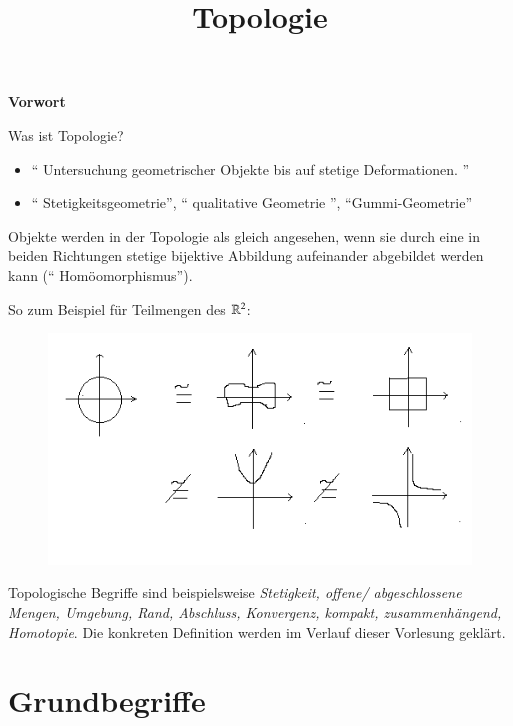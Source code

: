 \documentclass[a4paper,10pt]{scrartcl}
\title{Topologie}
\begin{document}
\maketitle

\tableofcontents
\newpage
\begin{center}
\LARGE\textbf{Vorwort}
\end{center}
\begin{seg}{Was ist Topologie?}
\begin{itemize}
\item "` Untersuchung geometrischer Objekte bis auf stetige Deformationen. "'
\item "` Stetigkeitsgeometrie"', "` qualitative Geometrie "', "`Gummi-Geometrie"'
\end{itemize}
Objekte werden in der Topologie als gleich angesehen, wenn sie durch eine in beiden Richtungen stetige bijektive Abbildung aufeinander abgebildet werden kann ("` Homöomorphismus"').
\end{seg}
So zum Beispiel für Teilmengen des $\mathbb{R}^2$:
\begin{figure}[h]
\centering
\includegraphics[scale=0.7]{fig1.png}
\end{figure}
\begin{ex*} 
Topologische Begriffe sind beispielsweise \emph{Stetigkeit, offene/ abgeschlossene Mengen, Umgebung, Rand, Abschluss, Konvergenz, kompakt, zusammenhängend, Homotopie}.  Die konkreten Definition werden im Verlauf dieser Vorlesung geklärt.
\end{ex*}
\section{Grundbegriffe}
\end{document}
